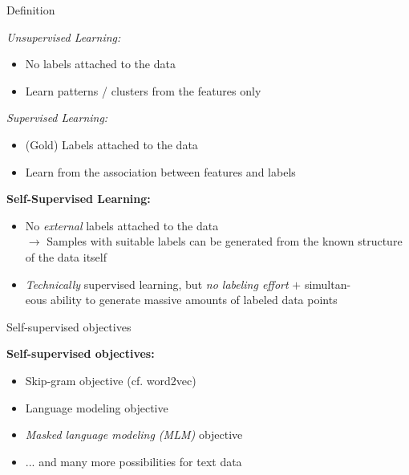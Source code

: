 \begin{frame}{Definition}

	\vfill 
	
	\textit{Unsupervised Learning:}

	\begin{itemize}
		\item No labels attached to the data
		\item Learn patterns / clusters from the features only
	\end{itemize}
	
	\textit{Supervised Learning:}

	\begin{itemize}
		\item (Gold) Labels attached to the data
		\item Learn from the association between features and labels
	\end{itemize}
	
	\textbf{Self-Supervised Learning:}

	\begin{itemize}
		\item No \textit{external} labels attached to the data\\
					$\to$ Samples with suitable labels can be generated from the known structure of the data itself 
		\item \textit{Technically} supervised learning, but \textit{no labeling effort} $+$ simultan-\\eous ability to generate massive amounts of labeled data points
	\end{itemize}
	
	\vfill 
	
\end{frame}


\begin{vbframe}{Self-supervised objectives}

\vfill

\textbf{Self-supervised objectives:}
	
	\begin{itemize}
		\item Skip-gram objective (cf. word2vec)
		\item Language modeling objective
		\item \textit{Masked language modeling (MLM)} objective
		\item ... and many more possibilities for text data
	\end{itemize}
\vfill

\end{vbframe}


\endlecture
